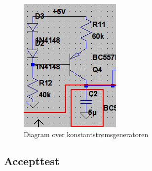 \begin{figure}[h]
\centering
\includegraphics[scale=.6]{implementering/volumenkontrol/konstantstroemsgenerator.png}
\caption{Diagram over konstantstrømsgeneratoren}
\label{fig:volumenkontrol_konstantstroemsgenerator_diagram}
\end{figure}

\subsection{Accepttest}
\label{volumenkontrol-accepttest}